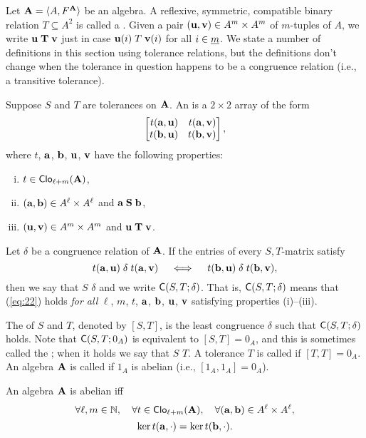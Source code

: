 Let $\mathbf{A} = \langle A, F^{\mathbf{A}}\rangle$ be an algebra.
A reflexive, symmetric, compatible binary relation $T\subseteq A^2$ is called a
.  
Given a pair $(\mathbf{u}, \mathbf{v}) \in A^m\times A^m$ of $m$-tuples of $A$, we write 
$\mathbf{u} \mathrel{\mathbf{T}} \mathbf{v}$ just in case $\mathbf{u}(i) \mathrel{T} \mathbf{v}(i)$ for all $i\in \underline{m}$. 
We state a number of definitions in this section using tolerance relations, but 
the definitions don't change when the tolerance in question happens to be
a congruence relation (i.e., a transitive tolerance).

Suppose $S$ and $T$ are tolerances on $\mathbf{A}$.  An  
is a $2\times 2$ array of the form
\[
\begin{bmatrix*}[r] t(\ba,\bu) & t(\ba,\bv)\\ t(\bb,\bu)&t(\bb,\bv)\end{bmatrix*},
\]
where $t$, $\mathbf{a}$, $\mathbf{b}$, $\mathbf{u}$, $\mathbf{v}$ have the following properties:
\begin{enumerate}[(i)] %
\item $t\in \operatorname{\mathsf{Clo}}_{\ell + m}(\mathbf{A})$,
\item $(\mathbf{a}, \mathbf{b})\in A^\ell\times A^\ell$ and $\mathbf{a} \mathrel{\mathbf{S}} \mathbf{b}$,
\item $(\mathbf{u}, \mathbf{v})\in A^m\times A^m$ and $\mathbf{u} \mathrel{\mathbf{T}} \mathbf{v}$.
\end{enumerate}
Let $\delta$ be a congruence relation of $\mathbf{A}$.
If the entries of every $S,T$-matrix satisfy
\begin{equation}
  \label{eq:22}
t(\mathbf{a},\mathbf{u}) \mathrel{\delta} t(\mathbf{a},\mathbf{v})\quad \iff \quad t(\mathbf{b},\mathbf{u}) \mathrel{\delta} t(\mathbf{b},\mathbf{v}),
\end{equation}
then we say that $S$  $\delta$ and we write 
$\mathsf{C}(S, T; \delta)$.
That is, $\mathsf{C}(S, T; \delta)$  means that 
(\ref{eq:22}) holds \emph{for all}
$\ell$, $m$, $t$, $\mathbf{a}$, $\mathbf{b}$, $\mathbf{u}$, $\mathbf{v}$ satisfying properties (i)--(iii).

The  of $S$ and $T$, denoted by $[S, T]$,
is the least congruence $\delta$ such that $\mathsf{C}(S, T; \delta)$ 
holds.  
Note that $\mathsf{C}(S, T; 0_A)$ is equivalent to $[S,T] = 0_A$, and this
is sometimes called the ;
when it holds we say  that
$S$  $T$. %
A tolerance $T$ is called  if
$[T, T] = 0_A$.  
An algebra $\mathbf{A}$ is called  if $1_A$ is abelian
(i.e., $[1_A,1_A] = 0_A$).

\begin{rem}
  An algebra $\mathbf{A}$ is abelian iff %
  \[
  \forall \ell, m \in \mathbb{N},
  \quad \forall t\in \operatorname{\mathsf{Clo}}_{\ell + m}(\mathbf{A}),
  \quad \forall (\mathbf{a}, \mathbf{b})\in A^\ell\times A^\ell,
  \]
  \[
  \ker t(\mathbf{a}, \cdot)=\ker t(\mathbf{b}, \cdot).
  \]
\end{rem}


